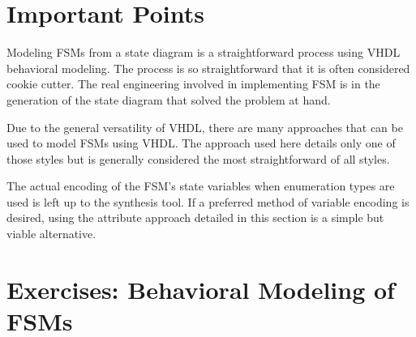 \section{Important Points}

\begin{my_list}
\item Modeling FSMs from a state diagram is a straightforward process using VHDL behavioral modeling. The process is so straightforward that it is often considered cookie cutter. The real engineering involved in implementing FSM is in the generation of the state diagram that solved the problem at hand.

\item Due to the general versatility of VHDL, there are many approaches that can be used to model FSMs using VHDL. The approach used here details only one of those styles but is generally considered the most straightforward of all styles.

\item The actual encoding of the FSM's state variables when enumeration types are used is left up to the synthesis tool. If a preferred method of variable encoding is desired, using the attribute approach detailed in this section is a simple but viable alternative.
\end{my_list}

\section{Exercises: Behavioral Modeling of FSMs}


